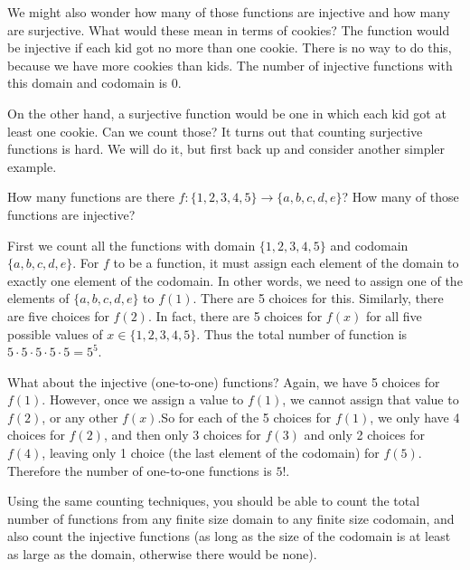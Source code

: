 \documentclass[12pt]{article}
\begin{document}
We might also wonder how many of those functions are injective and how many are surjective.  What would these mean in terms of cookies?  The function would be injective if each kid got no more than one cookie.  There is no way to do this, because we have more cookies than kids.  The number of injective functions with this domain and codomain is 0.  

On the other hand, a surjective function would be one in which each kid got at least one cookie.  Can we count those? It turns out that counting surjective functions is hard.  We will do it, but first back up and consider another simpler example.

\begin{example}
  How many functions are there $f: \{1,2,3,4,5\} \to \{a,b,c,d,e\}$?  How many of those functions are injective? 
  \begin{solution}
    First we count all the functions with domain $\{1,2,3,4,5\}$ and codomain $\{a,b,c,d,e\}$.  For $f$ to be a function, it must assign each element of the domain to exactly one element of the codomain.  In other words, we need to assign one of the elements of $\{a,b,c,d,e\}$ to $f(1)$.  There are 5 choices for this.  Similarly, there are five choices for $f(2)$.  In fact, there are 5 choices for $f(x)$ for all five possible values of $x \in \{1,2,3,4,5\}$.  Thus the total number of function is $5 \cdot 5 \cdot 5 \cdot 5 \cdot 5 = 5^5$.
    
    What about the injective (one-to-one) functions?  Again, we have 5 choices for $f(1)$.  However, once we assign a value to $f(1)$, we cannot assign that value to $f(2)$, or any other $f(x)$.\footnotemark  So for each of the 5 choices for $f(1)$, we only have 4 choices for $f(2)$, and then only 3 choices for $f(3)$ and only 2 choices for $f(4)$, leaving only 1 choice (the last element of the codomain) for $f(5)$.  Therefore the number of one-to-one functions is $5!$.
  \end{solution}

\end{example}

Using the same counting techniques, you should be able to count the total number of functions from any finite size domain to any finite size codomain, and also count the injective functions (as long as the size of the codomain is at least as large as the domain, otherwise there would be none).
\end{document}
